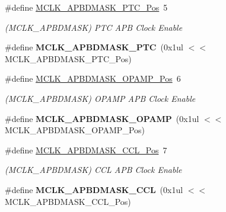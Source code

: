 \begin{DoxyCompactItemize}
\item 
\hypertarget{group___s_a_m_l21___m_c_l_k_ga316b3e3d84370e9142e997abf7224527}{}\#define \hyperlink{group___s_a_m_l21___m_c_l_k_ga316b3e3d84370e9142e997abf7224527}{M\+C\+L\+K\+\_\+\+A\+P\+B\+D\+M\+A\+S\+K\+\_\+\+P\+T\+C\+\_\+\+Pos}~5\label{group___s_a_m_l21___m_c_l_k_ga316b3e3d84370e9142e997abf7224527}

\begin{DoxyCompactList}\small\item\em (M\+C\+L\+K\+\_\+\+A\+P\+B\+D\+M\+A\+S\+K) P\+T\+C A\+P\+B Clock Enable \end{DoxyCompactList}\item 
\hypertarget{group___s_a_m_l21___m_c_l_k_gaf57c394f5082ccebc06ecd7d7c2a161b}{}\#define {\bfseries M\+C\+L\+K\+\_\+\+A\+P\+B\+D\+M\+A\+S\+K\+\_\+\+P\+T\+C}~(0x1ul $<$$<$ M\+C\+L\+K\+\_\+\+A\+P\+B\+D\+M\+A\+S\+K\+\_\+\+P\+T\+C\+\_\+\+Pos)\label{group___s_a_m_l21___m_c_l_k_gaf57c394f5082ccebc06ecd7d7c2a161b}

\item 
\hypertarget{group___s_a_m_l21___m_c_l_k_ga9519c2ae50777e3ebcb13ccf4bb9f562}{}\#define \hyperlink{group___s_a_m_l21___m_c_l_k_ga9519c2ae50777e3ebcb13ccf4bb9f562}{M\+C\+L\+K\+\_\+\+A\+P\+B\+D\+M\+A\+S\+K\+\_\+\+O\+P\+A\+M\+P\+\_\+\+Pos}~6\label{group___s_a_m_l21___m_c_l_k_ga9519c2ae50777e3ebcb13ccf4bb9f562}

\begin{DoxyCompactList}\small\item\em (M\+C\+L\+K\+\_\+\+A\+P\+B\+D\+M\+A\+S\+K) O\+P\+A\+M\+P A\+P\+B Clock Enable \end{DoxyCompactList}\item 
\hypertarget{group___s_a_m_l21___m_c_l_k_ga8d5ae02e51db6550b623552311d738c6}{}\#define {\bfseries M\+C\+L\+K\+\_\+\+A\+P\+B\+D\+M\+A\+S\+K\+\_\+\+O\+P\+A\+M\+P}~(0x1ul $<$$<$ M\+C\+L\+K\+\_\+\+A\+P\+B\+D\+M\+A\+S\+K\+\_\+\+O\+P\+A\+M\+P\+\_\+\+Pos)\label{group___s_a_m_l21___m_c_l_k_ga8d5ae02e51db6550b623552311d738c6}

\item 
\hypertarget{group___s_a_m_l21___m_c_l_k_gadd0703ea141f13c69460177cd037090b}{}\#define \hyperlink{group___s_a_m_l21___m_c_l_k_gadd0703ea141f13c69460177cd037090b}{M\+C\+L\+K\+\_\+\+A\+P\+B\+D\+M\+A\+S\+K\+\_\+\+C\+C\+L\+\_\+\+Pos}~7\label{group___s_a_m_l21___m_c_l_k_gadd0703ea141f13c69460177cd037090b}

\begin{DoxyCompactList}\small\item\em (M\+C\+L\+K\+\_\+\+A\+P\+B\+D\+M\+A\+S\+K) C\+C\+L A\+P\+B Clock Enable \end{DoxyCompactList}\item 
\hypertarget{group___s_a_m_l21___m_c_l_k_ga184b441b35c401bb44ea57cc32168b8b}{}\#define {\bfseries M\+C\+L\+K\+\_\+\+A\+P\+B\+D\+M\+A\+S\+K\+\_\+\+C\+C\+L}~(0x1ul $<$$<$ M\+C\+L\+K\+\_\+\+A\+P\+B\+D\+M\+A\+S\+K\+\_\+\+C\+C\+L\+\_\+\+Pos)\label{group___s_a_m_l21___m_c_l_k_ga184b441b35c401bb44ea57cc32168b8b}


\end{DoxyCompactItemize}
